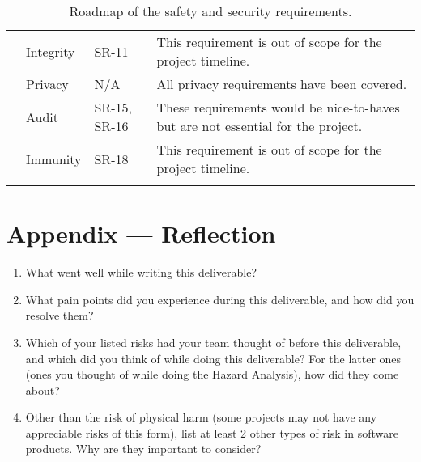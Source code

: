 \documentclass{article}
\begin{document}
\begin{longtable}[c]{|m{2.5cm}|m{2.6cm}|m{2cm}|m{3.6cm}|}
    \cline{2-4}
    & Integrity & SR-11 & This requirement is out of scope for the project timeline.\\
    \cline{2-4}
    & Privacy & N/A & All privacy requirements have been covered.\\
    \cline{2-4}
    & Audit & SR-15, SR-16 & These requirements would be nice-to-haves but are not essential for the project.\\
    \cline{2-4}
    & Immunity & SR-18 & This requirement is out of scope for the project timeline.\\
    \hline
    \caption{Roadmap of the safety and security requirements.}
\end{longtable}

\newpage{}

\section*{Appendix --- Reflection}




\begin{enumerate}
    \item What went well while writing this deliverable? 
    \item What pain points did you experience during this deliverable, and how
    did you resolve them?
    \item Which of your listed risks had your team thought of before this
    deliverable, and which did you think of while doing this deliverable? For
    the latter ones (ones you thought of while doing the Hazard Analysis), how
    did they come about?
    \item Other than the risk of physical harm (some projects may not have any
    appreciable risks of this form), list at least 2 other types of risk in
    software products. Why are they important to consider?
\end{enumerate}
\end{document}
